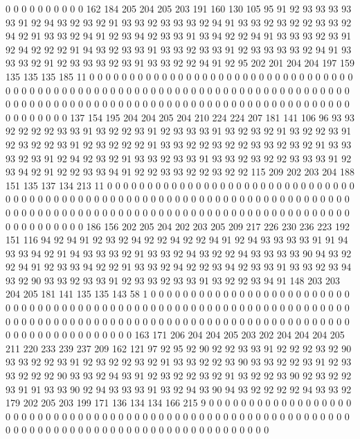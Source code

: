 0 0 0 0 0 0 0 0 0 0 162 184 205 204 205 203 191 160 130 105
95 91 92 93 93 93 93 93 91 92 94 93 92 93 92 91 93 93 92 93
93 93 92 94 91 93 93 92 93 92 92 93 93 92 94 92 91 93 93 92
94 91 92 93 94 92 93 93 91 93 94 92 92 94 91 93 93 93 92 93
91 92 94 92 92 92 91 94 93 92 93 93 91 93 93 92 93 93 91 92
93 93 93 93 92 94 91 93 93 93 92 91 92 93 93 93 92 93 91 93
93 92 92 94 91 92 95 202 201 204 204 197 159 135 135 135 185 11 0 0
0 0 0 0 0 0 0 0 0 0 0 0 0 0 0 0 0 0 0 0
0 0 0 0 0 0 0 0 0 0 0 0 0 0 0 0 0 0 0 0
0 0 0 0 0 0 0 0 0 0 0 0 0 0 0 0 0 0 0 0
0 0 0 0 0 0 0 0 0 0 0 0 0 0 0 0 0 0 0 0
0 0 0 0 0 0 0 0 0 0 0 0 0 0 0 0 0 0 0 0
0 0 0 0 0 0 0 0 0 0 0 0 0 0 0 0 0 0 0 0
0 0 0 0 0 137 154 195 204 204 205 204 210 224 224 207 181 141 106 96
93 93 92 92 92 92 93 93 91 93 92 92 93 91 92 93 93 93 91 93
92 93 92 91 93 92 92 93 91 92 93 92 92 93 91 92 93 92 92 92
91 93 93 92 92 93 92 92 93 93 92 93 92 91 93 93 93 92 93 91
92 94 92 93 92 91 93 93 92 93 93 91 93 93 92 93 92 92 93 93
93 91 92 93 94 92 91 92 92 93 93 94 91 92 92 93 93 92 92 93
92 92 115 209 202 203 204 188 151 135 137 134 213 11 0 0 0 0 0 0
0 0 0 0 0 0 0 0 0 0 0 0 0 0 0 0 0 0 0 0
0 0 0 0 0 0 0 0 0 0 0 0 0 0 0 0 0 0 0 0
0 0 0 0 0 0 0 0 0 0 0 0 0 0 0 0 0 0 0 0
0 0 0 0 0 0 0 0 0 0 0 0 0 0 0 0 0 0 0 0
0 0 0 0 0 0 0 0 0 0 0 0 0 0 0 0 0 0 0 0
0 0 0 0 0 0 0 0 0 0 0 0 0 0 0 0 0 0 0 0
0 186 156 202 205 204 202 203 205 209 217 226 230 236 223 192 151 116 94 92
94 91 92 93 92 94 92 92 94 92 92 94 91 92 94 93 93 93 93 91
91 94 93 93 94 92 91 94 93 93 93 92 91 93 93 92 94 93 92 92
94 93 93 93 93 90 94 93 92 92 94 91 92 93 93 94 92 92 91 93
93 92 94 92 92 93 94 92 93 93 91 93 93 92 93 94 93 92 90 93
93 92 93 93 91 92 93 93 92 93 93 91 93 92 92 93 94 91 148 203
203 204 205 181 141 135 135 143 58 1 0 0 0 0 0 0 0 0 0 0
0 0 0 0 0 0 0 0 0 0 0 0 0 0 0 0 0 0 0 0
0 0 0 0 0 0 0 0 0 0 0 0 0 0 0 0 0 0 0 0
0 0 0 0 0 0 0 0 0 0 0 0 0 0 0 0 0 0 0 0
0 0 0 0 0 0 0 0 0 0 0 0 0 0 0 0 0 0 0 0
0 0 0 0 0 0 0 0 0 0 0 0 0 0 0 0 0 0 0 0
0 0 0 0 0 0 0 0 0 0 0 0 0 0 0 0 0 163 171 206
204 204 205 203 202 204 204 204 205 211 220 233 239 237 209 162 121 97 92 95
92 90 92 92 93 93 91 92 92 92 93 92 90 93 93 92 92 93 91 92
93 92 92 93 92 91 93 93 92 92 93 90 93 93 92 92 93 91 92 93
93 92 92 92 90 93 93 92 94 93 91 92 93 92 92 93 92 91 93 92
92 93 90 92 93 92 92 93 91 91 93 93 90 92 94 93 93 93 91 93
92 94 93 90 94 93 92 92 92 92 94 93 93 92 179 202 205 203 199 171
136 134 134 166 215 9 0 0 0 0 0 0 0 0 0 0 0 0 0 0
0 0 0 0 0 0 0 0 0 0 0 0 0 0 0 0 0 0 0 0
0 0 0 0 0 0 0 0 0 0 0 0 0 0 0 0 0 0 0 0
0 0 0 0 0 0 0 0 0 0 0 0 0 0 0 0 0 0 0 0
0 0 0 0 0 0 0 0 0 0 0 0 0 0 0 0 0 0 0 0
